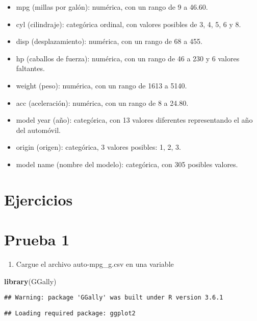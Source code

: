 \documentclass[]{article}
\newenvironment{Shaded}{\begin{snugshade}}{\end{snugshade}}
\newcommand{\KeywordTok}[1]{\textcolor[rgb]{0.13,0.29,0.53}{\textbf{#1}}}
\newcommand{\NormalTok}[1]{#1}
\providecommand{\tightlist}{%
  \setlength{\itemsep}{0pt}\setlength{\parskip}{0pt}}
\begin{document}
\begin{itemize}
\tightlist
\item
  mpg (millas por galón): numérica, con un rango de 9 a 46.60.
\item
  cyl (cilindraje): categórica ordinal, con valores posibles de 3, 4, 5,
  6 y 8.
\item
  disp (desplazamiento): numérica, con un rango de 68 a 455.
\item
  hp (caballos de fuerza): numérica, con un rango de 46 a 230 y 6
  valores faltantes.
\item
  weight (peso): numérica, con un rango de 1613 a 5140.
\item
  acc (aceleración): numérica, con un rango de 8 a 24.80.
\item
  model year (año): categórica, con 13 valores diferentes representando
  el año del automóvil.
\item
  origin (origen): categórica, 3 valores posibles: 1, 2, 3.
\item
  model name (nombre del modelo): categórica, con 305 posibles valores.
\end{itemize}

\hypertarget{ejercicios}{%
\section{Ejercicios}\label{ejercicios}}

\hypertarget{prueba-1}{%
\section{Prueba 1}\label{prueba-1}}

\begin{enumerate}
\def\labelenumi{\arabic{enumi}.}
\tightlist
\item
  Cargue el archivo auto-mpg\_g.csv en una variable
\end{enumerate}

\begin{Shaded}
\begin{Highlighting}[]
  \KeywordTok{library}\NormalTok{(GGally)}
\end{Highlighting}
\end{Shaded}

\begin{verbatim}
## Warning: package 'GGally' was built under R version 3.6.1
\end{verbatim}

\begin{verbatim}
## Loading required package: ggplot2
\end{verbatim}
\end{document}
